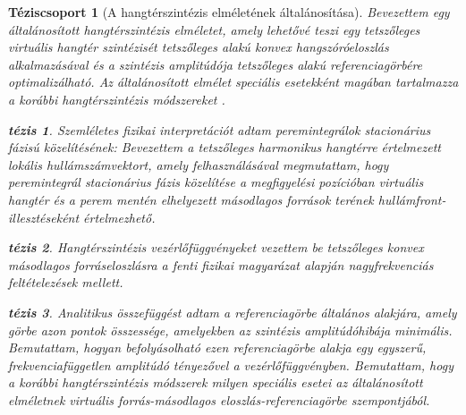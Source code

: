 \documentclass[10pt,twoside]{article}
\theoremstyle{thesisgroupstyle}
\newtheorem{thesisgroup}{Téziscsoport}
\theoremstyle{indented}
\newtheorem{thesis}{tézis}[thesisgroup]
\begin{document}
\begin{thesisgroup}[A hangtérszintézis elméletének általánosítása]
Bevezettem egy általánosított hangtérszintézis elméletet, amely lehetővé teszi egy tetszőleges virtuális hangtér szintézisét tetszőleges alakú konvex hangszóróeloszlás alkalmazásával és a szintézis amplitúdója tetszőleges alakú referenciagörbére optimalizálható.
Az általánosított elmélet speciális esetekként magában tartalmazza  a korábbi hangtérszintézis módszereket \cite{Firtha2016_booklet}.
\begin{thesis}
Szemléletes fizikai interpretációt adtam peremintegrálok stacionárius fázisú közelítésének:
Bevezettem a tetszőleges harmonikus hangtérre értelmezett lokális hullámszámvektort, amely felhasználásával megmutattam, hogy peremintegrál stacionárius fázis közelítése a megfigyelési pozícióban virtuális hangtér és a perem mentén elhelyezett másodlagos források terének hullámfront-illesztéseként értelmezhető.
\end{thesis}
\begin{thesis}
Hangtérszintézis vezérlőfüggvényeket vezettem be tetszőleges konvex másodlagos forráseloszlásra a fenti fizikai magyarázat alapján nagyfrekvenciás feltételezések mellett.
\end{thesis}
\begin{thesis}
Analitikus összefüggést adtam a referenciagörbe általános alakjára, amely görbe azon pontok összessége, amelyekben az szintézis amplitúdóhibája minimális.
Bemutattam, hogyan befolyásolható ezen referenciagörbe alakja egy egyszerű, frekvenciafüggetlen amplitúdó tényezővel a vezérlőfüggvényben.
Bemutattam, hogy a korábbi hangtérszintézis módszerek milyen speciális esetei az általánosított elméletnek virtuális forrás-másodlagos eloszlás-referenciagörbe szempontjából.
\end{thesis}
\end{thesisgroup}
\end{document}
